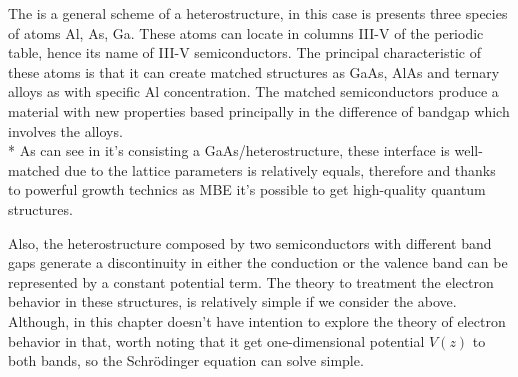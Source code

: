 The  is a general scheme of a heterostructure, in this case is presents three species of atoms Al, As, Ga. These atoms can   locate in columns III-V of the periodic table, hence its name of III-V semiconductors. The principal characteristic of these atoms is that it can create matched structures as GaAs, AlAs and ternary alloys as \algaas with specific Al concentration. The matched semiconductors produce a material with new properties based principally in the difference of bandgap which involves the alloys. \\* 
As can see in  it's consisting a GaAs/\algaas heterostructure, these interface is well-matched due to the lattice parameters is relatively equals, therefore and thanks to powerful growth technics as MBE it's possible to get high-quality quantum structures. 

Also, the heterostructure composed by two semiconductors with different band gaps generate a discontinuity in either the conduction or the valence band can be represented by a constant potential term\cite{harrison2016quantum}.  The theory to treatment the electron behavior in these structures, is relatively simple if we consider the above. 
Although, in this chapter doesn't have intention to explore the theory of electron behavior in that, worth noting that  it get one-dimensional potential $V(z)$ to both bands, so the Schr\"odinger equation can solve simple. 




